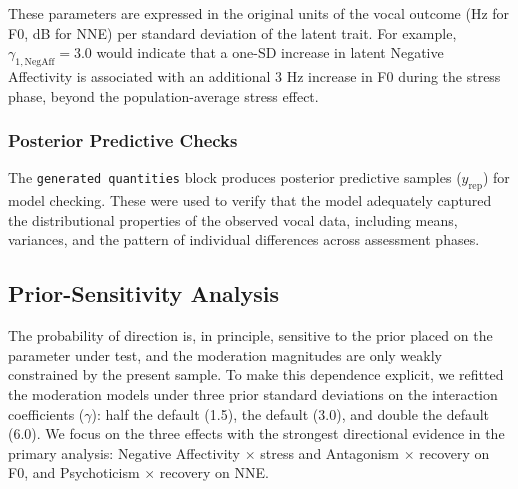 \documentclass[
  english,
  man,floatsintext]{apa6}
\begin{document}
These parameters are expressed in the original units of the vocal outcome (Hz for F0, dB for NNE) per standard deviation of the latent trait. For example, \(\gamma_{1,\text{NegAff}} = 3.0\) would indicate that a one-SD increase in latent Negative Affectivity is associated with an additional 3 Hz increase in F0 during the stress phase, beyond the population-average stress effect.

\subsubsection{Posterior Predictive Checks}\label{posterior-predictive-checks}

The \texttt{generated\ quantities} block produces posterior predictive samples (\(y_{\text{rep}}\)) for model checking. These were used to verify that the model adequately captured the distributional properties of the observed vocal data, including means, variances, and the pattern of individual differences across assessment phases.

\newpage

\subsection{Prior-Sensitivity Analysis}\label{prior-sensitivity-analysis}

The probability of direction is, in principle, sensitive to the prior placed on the
parameter under test, and the moderation magnitudes are only weakly constrained by the
present sample. To make this dependence explicit, we refitted the moderation models under
three prior standard deviations on the interaction coefficients (\(\gamma\)): half the
default (1.5), the default (3.0), and double the default (6.0). We focus on the three
effects with the strongest directional evidence in the primary analysis: Negative
Affectivity \(\times\) stress and Antagonism \(\times\) recovery on F0, and
Psychoticism \(\times\) recovery on NNE.
\end{document}
